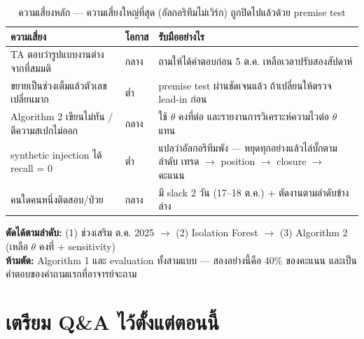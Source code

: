 \documentclass[11pt,a4paper]{article}
\newcommand{\sansall}{\sffamily}
\newcommand{\thd}[1]{\sansall\bfseries #1}
\begin{document}
\begin{table}[H]
\centering\small
\begin{tabular}{L{4.6cm}L{2.0cm}L{7.6cm}}
\toprule
\thd{ความเสี่ยง} & \thd{โอกาส} & \thd{รับมืออย่างไร} \\
\midrule
TA ตอบว่ารูปแบบงานต่างจากที่สมมติ & กลาง & ถามให้ได้คำตอบก่อน 5 ต.ค. เหลือเวลาปรับสองสัปดาห์ \\
\addlinespace
ขยายเป็นช่วงเต็มแล้วตัวเลขเปลี่ยนมาก & ต่ำ & premise test ผ่านชัดเจนแล้ว ถ้าเปลี่ยนให้ตรวจ lead-in ก่อน \\
\addlinespace
Algorithm 2 เขียนไม่ทัน / ตีความสเปกไม่ออก & กลาง & ใช้ $\theta$ คงที่ต่อ และรายงานการวิเคราะห์ความไวต่อ $\theta$ แทน \\
\addlinespace
synthetic injection ได้ recall = 0 & ต่ำ & แปลว่าอัลกอริทึมพัง --- หยุดทุกอย่างแล้วไล่บั๊กตามลำดับ
  เทรด \ensuremath{\to} position \ensuremath{\to} closure \ensuremath{\to} คะแนน \\
\addlinespace
คนใดคนหนึ่งติดสอบ/ป่วย & กลาง & มี slack 2 วัน (17--18 ต.ค.) + ตัดงานตามลำดับข้างล่าง \\
\bottomrule
\end{tabular}
\caption{ความเสี่ยงหลัก --- ความเสี่ยงใหญ่ที่สุด (อัลกอริทึมไม่เวิร์ก) ถูกปิดไปแล้วด้วย premise test}
\end{table}

\begin{keybox}[title={ถ้าช้า ตัดตามลำดับนี้ --- และห้ามตัดสองอย่าง}]
\textbf{ตัดได้ตามลำดับ:} (1) ช่วงเสริม ต.ค. 2025 \ensuremath{\to} (2) Isolation Forest
\ensuremath{\to} (3) Algorithm 2 (เหลือ $\theta$ คงที่ + sensitivity)\\[3pt]
\textbf{ห้ามตัด:} Algorithm 1 และ evaluation ทั้งสามแบบ --- สองอย่างนี้คือ 40\% ของคะแนน
และเป็นคำตอบของคำถามแรกที่อาจารย์จะถาม
\end{keybox}

\section{เตรียม Q\&A ไว้ตั้งแต่ตอนนี้}
\end{document}
